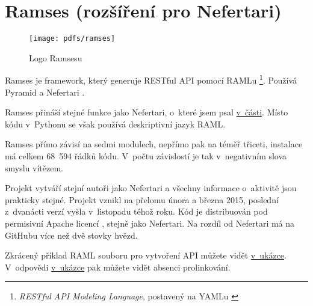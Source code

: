 \section{Ramses (rozšíření pro Nefertari)}\label{ramses-rozux161uxedux159enuxed-pro-nefertari}

\begin{figure}
\centering
\texttt{[image: pdfs/ramses]}
\caption{Logo Ramsesu \autocite{ramses}\label{pic:ramses}}
\end{figure}

Ramses je framework, který generuje RESTful API pomocí RAMLu \footnote{\emph{RESTful API Modeling Language}, postavený na YAMLu \autocite{raml}}. Používá Pyramid a Nefertari \autocite{ramsesdoc}.

Ramses přináší stejné funkce jako Nefertari, o~které jsem psal \protect\hyperlink{nefertari}{v~části}. Místo kódu v~Pythonu se však používá deskriptivní jazyk RAML.

Ramses přímo závisí na sedmi modulech, nepřímo pak na téměř třiceti, instalace má celkem 68~594 řádků kódu. V~počtu závislostí je tak v~negativním slova smyslu vítězem.

Projekt vytváří stejní autoři jako Nefertari a všechny informace o~aktivitě jsou prakticky stejné. Projekt vznikl na přelomu února a března 2015, poslední z~dvanácti verzí vyšla v~listopadu téhož roku. Kód je distribuován pod permisivní Apache licencí \autocite{apache}, stejně jako Nefertari. Na rozdíl od Nefertari má na GitHubu více než dvě stovky hvězd.

Zkrácený příklad RAML souboru pro vytvoření API můžete vidět \protect\hyperlink{code:ramses}{v~ukázce}. V~odpovědi \protect\hyperlink{code:ramsesreply}{v~ukázce} pak můžete vidět absenci prolinkování.

